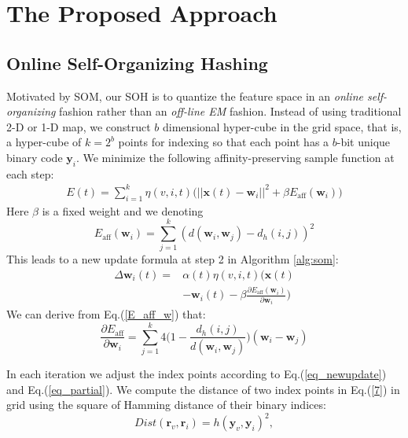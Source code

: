 \documentclass{article}
\begin{document}
\section{The Proposed Approach}
\subsection{Online Self-Organizing Hashing}
Motivated by SOM, our SOH is to quantize the feature space in an \emph{online self-organizing} fashion rather than an \emph{off-line EM} fashion. Instead of using traditional 2-D or 1-D map, we construct
$b$ dimensional hyper-cube in the grid space, that is, a hyper-cube of $k=2^{b}$ points for indexing so
that each point has a $b$-bit unique binary code $\mathbf{y}_{i}$. We minimize the following affinity-preserving sample function at each step:
\begin{equation}\label{objective_soh}
\begin{split}
E(t) = \sum_{i=1}^{k} \eta(v, i, t) \big( ||\mathbf{x}(t) - \mathbf{w}_{i}||^{2} + \beta  E_{\mathrm{aff}}(\mathbf{w}_{i})\big)
\end{split}
\end{equation}
Here $\beta$ is a fixed weight and we denoting
\begin{equation}\label{E_aff_w}
E_{\mathrm{aff}}(\mathbf{w}_{i}) =  \sum_{j=1}^{k}(d(\mathbf{w}_{i}, \mathbf{w}_{j}) - d_{h}(i, j))^{2}
\end{equation}
This leads to a new update formula at  step 2 in Algorithm \ref{alg:som}:
\begin{equation}\label{eq_newupdate}
\begin{split}
\Delta\mathbf{w}_{i}(t) = &  \alpha(t)\eta(v, i, t)\big(\mathbf{x}(t) \\ &- \mathbf{w}_{i}(t) -  \beta \frac{\partial E_{\mathrm{aff}}(\mathbf{w}_{i})}{\partial \mathbf{w}_{i}}\big)
\end{split}
\end{equation}
We can derive from Eq.(\ref{E_aff_w}) that:
\begin{equation}\label{eq_partial}
\frac{\partial E_{\mathrm{aff}}}{\partial \mathbf{w}_{i}} = \sum_{j=1}^{k}4 \Big(1 - \frac{d_{h}(i, j)}{d(\mathbf{w}_{i}, \mathbf{w}_{j})} \Big)(\mathbf{w}_{i} - \mathbf{w}_{j})
\end{equation}

In each iteration we adjust the index points according to Eq.(\ref{eq_newupdate}) and Eq.(\ref{eq_partial}). We compute the
distance of two index points in Eq.(\ref{7}) in grid using the square of Hamming distance of their binary indices:
\begin{equation}\label{10}
Dist(\mathbf{r}_{v} , \mathbf{r}_{i}) = h(\mathbf{y}_{v}, \mathbf{y}_{i})^2,
\end{equation}
\end{document}
